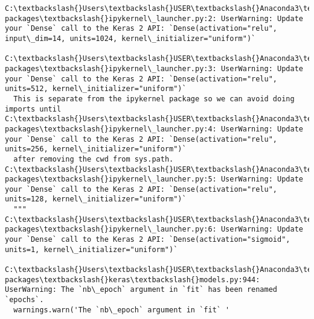 \documentclass[11pt]{article}
\begin{document}
    \begin{Verbatim}[commandchars=\\\{\}]
C:\textbackslash{}Users\textbackslash{}USER\textbackslash{}Anaconda3\textbackslash{}envs\textbackslash{}keras\_env\textbackslash{}lib\textbackslash{}site-packages\textbackslash{}ipykernel\_launcher.py:2: UserWarning: Update your `Dense` call to the Keras 2 API: `Dense(activation="relu", input\_dim=14, units=1024, kernel\_initializer="uniform")`
  
C:\textbackslash{}Users\textbackslash{}USER\textbackslash{}Anaconda3\textbackslash{}envs\textbackslash{}keras\_env\textbackslash{}lib\textbackslash{}site-packages\textbackslash{}ipykernel\_launcher.py:3: UserWarning: Update your `Dense` call to the Keras 2 API: `Dense(activation="relu", units=512, kernel\_initializer="uniform")`
  This is separate from the ipykernel package so we can avoid doing imports until
C:\textbackslash{}Users\textbackslash{}USER\textbackslash{}Anaconda3\textbackslash{}envs\textbackslash{}keras\_env\textbackslash{}lib\textbackslash{}site-packages\textbackslash{}ipykernel\_launcher.py:4: UserWarning: Update your `Dense` call to the Keras 2 API: `Dense(activation="relu", units=256, kernel\_initializer="uniform")`
  after removing the cwd from sys.path.
C:\textbackslash{}Users\textbackslash{}USER\textbackslash{}Anaconda3\textbackslash{}envs\textbackslash{}keras\_env\textbackslash{}lib\textbackslash{}site-packages\textbackslash{}ipykernel\_launcher.py:5: UserWarning: Update your `Dense` call to the Keras 2 API: `Dense(activation="relu", units=128, kernel\_initializer="uniform")`
  """
C:\textbackslash{}Users\textbackslash{}USER\textbackslash{}Anaconda3\textbackslash{}envs\textbackslash{}keras\_env\textbackslash{}lib\textbackslash{}site-packages\textbackslash{}ipykernel\_launcher.py:6: UserWarning: Update your `Dense` call to the Keras 2 API: `Dense(activation="sigmoid", units=1, kernel\_initializer="uniform")`
  
C:\textbackslash{}Users\textbackslash{}USER\textbackslash{}Anaconda3\textbackslash{}envs\textbackslash{}keras\_env\textbackslash{}lib\textbackslash{}site-packages\textbackslash{}keras\textbackslash{}models.py:944: UserWarning: The `nb\_epoch` argument in `fit` has been renamed `epochs`.
  warnings.warn('The `nb\_epoch` argument in `fit` '

    \end{Verbatim}
\end{document}
